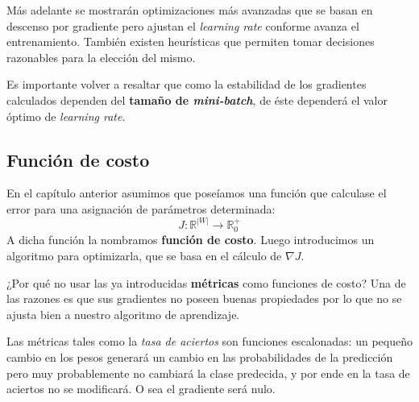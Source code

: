 Más adelante se mostrarán optimizaciones más avanzadas que se basan en descenso por gradiente pero ajustan el \textit{learning rate} conforme avanza el entrenamiento. También existen heurísticas que permiten tomar decisiones razonables para la elección del mismo.

Es importante volver a resaltar que como la estabilidad de los gradientes calculados dependen del \textbf{tamaño de \textit{mini-batch}}, de éste dependerá el valor óptimo de \textit{learning rate}.

\subsection{Función de costo}

En el capítulo anterior asumimos que poseíamos una función que calculase el error para una asignación de parámetros determinada: 
\begin{equation*}
    J :  \mathbb{R}^{|W|} \rightarrow \mathbb{R}_0^+
\end{equation*}
A dicha función la nombramos \textbf{función de costo}. Luego introducimos un algoritmo para optimizarla, que se basa en el cálculo de $ \nabla J $. 

¿Por qué no usar las ya introducidas \textbf{métricas} como funciones de costo? 
Una de las razones es que sus gradientes no poseen buenas propiedades por lo que no se ajusta bien a nuestro algoritmo de aprendizaje.

Las métricas tales como la \textit{tasa de aciertos} son funciones escalonadas: un pequeño cambio en los pesos generará un cambio en las probabilidades de la predicción pero muy probablemente no cambiará la clase predecida, y por ende en la tasa de aciertos no se modificará. O sea el gradiente será nulo.

